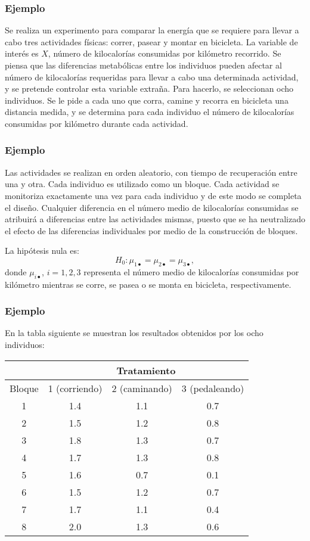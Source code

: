 \begin{frame}
\frametitle{Ejemplo}
{Se realiza un experimento para comparar la energía que se requiere para llevar a cabo tres actividades físicas: correr, pasear y montar en bicicleta. La variable de interés es $X$, número de kilocalorías consumidas por kilómetro  recorrido. Se piensa que las diferencias metabólicas entre los individuos pueden afectar al número de kilocalorías requeridas para llevar a cabo una determinada actividad, y se pretende controlar esta variable extraña. Para hacerlo, se seleccionan ocho individuos. Se le pide a cada uno que corra, camine y recorra en bicicleta una distancia medida, y se determina para cada individuo el número de kilocalorías consumidas por kilómetro durante cada actividad. }
\end{frame}

\begin{frame}
\frametitle{Ejemplo}
Las actividades se realizan en orden aleatorio, con tiempo de recuperación entre una y otra. Cada individuo es utilizado como un bloque. Cada actividad se monitoriza exactamente una vez para cada individuo y de este modo se completa el diseño. Cualquier diferencia en el número medio de kilocalorías consumidas se atribuirá a diferencias entre las actividades mismas, puesto que se ha neutralizado el efecto de las diferencias individuales por medio de la construcción de bloques.

La hipótesis nula es:
$$
H_0 : \mu_{1\bullet} = \mu_{2\bullet} = \mu_{3\bullet}, 
$$
donde $\mu_{i\bullet}$, $i=1,2,3$ representa el número medio de kilocalorías consumidas por kilómetro mientras se corre, se pasea o se monta en bicicleta, respectivamente.
\end{frame}
\begin{frame}
\frametitle{Ejemplo}
En la tabla siguiente se muestran los resultados obtenidos por los ocho individuos:
\begin{center}
\begin{tabular}{cccc}
\hline
&\multicolumn{3}{c}{Tratamiento}\\\hline
Bloque&1 (corriendo)&2 (caminando)&3 (pedaleando)\\\hline
1&1.4&1.1&0.7\\
2&1.5&1.2&0.8\\
3&1.8&1.3&0.7\\
4&1.7&1.3&0.8\\
5&1.6&0.7&0.1\\
6&1.5&1.2&0.7\\
7&1.7&1.1&0.4\\
8&2.0&1.3&0.6\\\hline		
\end{tabular}
\end{center}
\end{frame}
